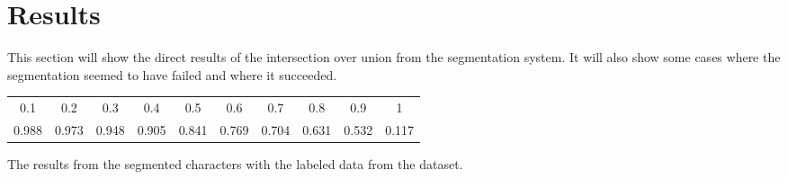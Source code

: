 \newpage
\section{Results} %
\label{sec:results}

This section will show the direct results of the intersection over union from the segmentation system. It will also show some cases where the segmentation seemed to have failed and where it succeeded.


\begin{minipage}{\linewidth}
\flushleft
{} \label{tab:results:iou} 
\begin{tabular}{ c c c c c c c c c c}
\hline
\hline
0.1		&	0.2		&	0.3		&	0.4		&	0.5		&	0.6		&	0.7		&	0.8		&	0.9		&	1		\\
0.988	&	0.973	&	0.948	&	0.905	&	0.841	&	0.769	&	0.704	&	0.631	&	0.532	&	0.117	\\
\hline
\end{tabular}\par
\bigskip
The results from the segmented characters with the labeled data from the dataset.
\end{minipage}








